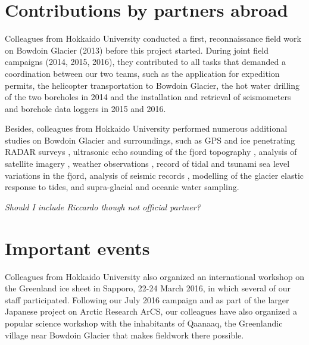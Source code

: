 \documentclass{article}
\begin{document}
\section{Contributions by partners abroad}

Colleagues from Hokkaido University conducted a first, reconnaissance field
work on Bowdoin Glacier (2013) before this project started. During joint field
campaigns (2014, 2015, 2016), they contributed to all tasks that demanded a
coordination between our two teams, such as the application for expedition
permits, the helicopter transportation to Bowdoin Glacier, the hot water
drilling of the two boreholes in 2014 and the installation and retrieval of
seismometers and borehole data loggers in 2015 and 2016.

Besides, colleagues from Hokkaido University performed numerous additional
studies on Bowdoin Glacier and surroundings, such as GPS and ice penetrating
RADAR surveys \citep{Sugiyama.etal.2015, Tatsuki.etal.2016}, ultrasonic echo
sounding of the fjord topography \citep{Sugiyama.etal.2015}, analysis of
satellite imagery \citep{Sugiyama.etal.2015, Sakakibara.etal.2016,
Tatsuki.etal.2016}, weather observations \citep{Sugiyama.etal.2015}, record of
tidal and tsunami sea level variations in the fjord, analysis of seismic
records \citep{Podoslkiy.etal.2016}, modelling of the glacier elastic response
to tides, and supra-glacial and oceanic water sampling.

\emph{Should I include Riccardo though not official partner?}


\section{Important events}

Colleagues from Hokkaido University also organized an international workshop
on the Greenland ice sheet in Sapporo, 22-24 March 2016, in which several of
our staff participated. Following our July 2016 campaign and as part of the
larger Japanese project on Arctic Research ArCS, our colleagues have also
organized a popular science workshop with the inhabitants of Qaanaaq, the
Greenlandic village near Bowdoin Glacier that makes fieldwork there possible.


\end{document}
